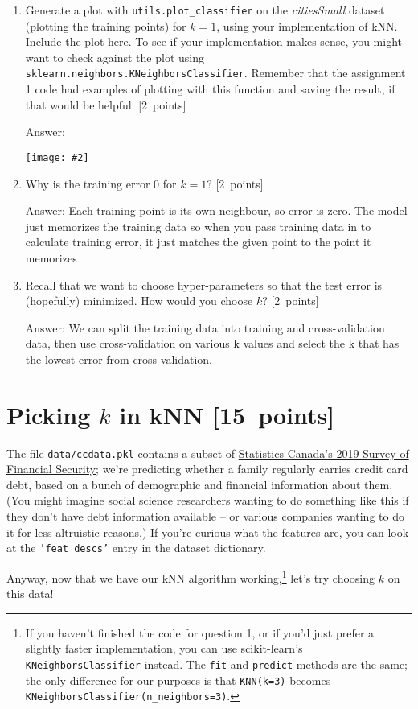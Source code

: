 \documentclass{article}
\newcommand{\blu}[1]{{\textcolor{blu}{#1}}}
\newcommand{\gre}[1]{\textcolor{gre}{#1}}
\newcommand\ans[1]{\par\gre{Answer: #1}}
\let\ask\blu
\newcommand\pts[1]{\textcolor{pointscolour}{[#1~points]}}
\newcommand{\centerfig}[2]{\begin{center}\texttt{[image: \#2]}\end{center}}
\begin{document}
\begin{enumerate}
        \item Generate a plot with \texttt{utils.plot\_classifier} on the \emph{citiesSmall} dataset (plotting the training points) for $k=1$, using your implementation of kNN. \ask{Include the plot here.} To see if your implementation makes sense, you might want to check against the plot using \texttt{sklearn.neighbors.KNeighborsClassifier}. Remember that the assignment 1 code had examples of plotting with this function and saving the result, if that would be helpful. \pts{2}
        \ans{
        \centerfig{.6}{figs/q1_3_citiesSmallKNNPlot.pdf}
        }
        \item Why is the training error $0$ for $k=1$? \pts{2}
        \ans{Each training point is its own neighbour, so error is zero. The model just memorizes the training data so when you pass training data in to calculate training error, it just matches the given point to the point it memorizes}
        
        \item Recall that we want to choose hyper-parameters so that the test error is (hopefully) minimized. How would you choose $k$? \pts{2}
        \ans{We can split the training data into training and cross-validation data, then use cross-validation on various k values and select the k that has the lowest error from cross-validation.}
        
    \end{enumerate}

    \clearpage
    \section{Picking $k$ in kNN \pts{15}}
    The file \texttt{data/ccdata.pkl} contains a subset of \href{https://www23.statcan.gc.ca/imdb/p2SV.pl?Function=getSurvey&SDDS=2620}{Statistics Canada's 2019 Survey of Financial Security}; we're predicting whether a family regularly carries credit card debt, based on a bunch of demographic and financial information about them. (You might imagine social science researchers wanting to do something like this if they don't have debt information available -- or various companies wanting to do it for less altruistic reasons.) If you're curious what the features are, you can look at the \texttt{'feat\_descs'} entry in the dataset dictionary.

    Anyway, now that we have our kNN algorithm working,\footnote{If you haven't finished the code for question 1, or if you'd just prefer a slightly faster implementation, you can use scikit-learn's \texttt{KNeighborsClassifier} instead. The \texttt{fit} and \texttt{predict} methods are the same; the only difference for our purposes is that \texttt{KNN(k=3)} becomes \texttt{KNeighborsClassifier(n\_neighbors=3)}.} let's try choosing $k$ on this data!
\end{document}
